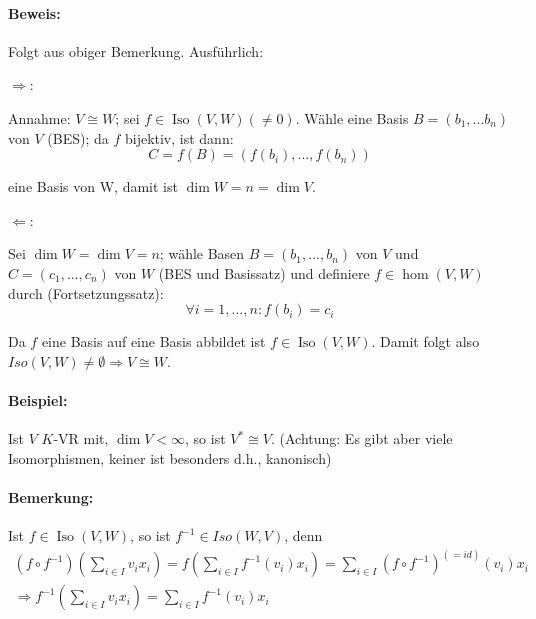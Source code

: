 \paragraph{Beweis: }
	Folgt aus obiger Bemerkung. Ausführlich:
		
	$\Rightarrow$:
	
	Annahme: $V \cong W$; sei $f\in \operatorname{Iso}(V,W)(\neq 0)$.
	Wähle eine Basis $B = (b_1, ... b_n)$ von $V$ (BES); da $f$ bijektiv, ist dann:
	\begin{equation*}
		C = f(B) = (f(b_i), ... , f(b_n))
	\end{equation*}
	
	eine Basis von W, damit ist $\dim W = n = \dim V$.
	
	$\Leftarrow$:
	
	Sei $\dim W = \dim V = n$;
	wähle Basen $B = (b_1, ... ,b_n)$ von $V$ und $C = (c_1, ... ,c_n)$ von $W$ (BES und Basissatz) und definiere $f\in \hom(V,W)$ durch (Fortsetzungssatz):
	\begin{equation*}
		\forall i = 1, ... ,n : f(b_i) = c_i
	\end{equation*}

	Da $f$ eine Basis auf eine Basis abbildet ist $f\in \operatorname{Iso}(V,W)$.
	Damit folgt also $Iso(V,W) \neq \emptyset \Rightarrow V \cong W$.
			
\paragraph{Beispiel: }
	Ist $V$ $K$-VR mit, $\dim V < \infty$, so ist $V^\ast \cong V$. (Achtung: Es gibt aber viele Isomorphismen, keiner ist besonders d.h., \glqq kanonisch\grqq )
	
\paragraph{Bemerkung: }
	Ist $f\in \operatorname{Iso}(V,W)$, so ist $f^{-1}\in Iso(W,V)$, denn
	\begin{gather*}
		(f\circ f^{-1})(\sum_{i\in I}v_ix_i) = f(\sum_{i\in I}f^{-1}(v_i)x_i) = \sum_{i\in I}(f\circ f^{-1})^{(= id)}(v_i)x_i\\
		\Rightarrow f^{-1}(\sum_{i\in I}v_ix_i) = \sum_{i\in I}f^{-1}(v_i)x_i
	\end{gather*}

